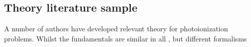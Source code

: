 \subsection{Theory literature sample\label{sec:theory-lit}}

A number of authors have developed relevant theory for photoionization problems. Whilst the fundamentals are similar in all , but different formalisms 